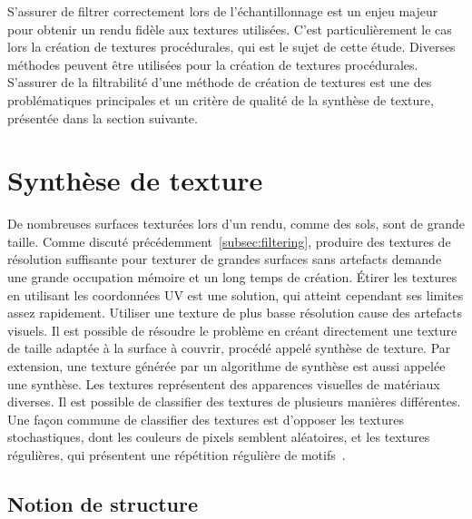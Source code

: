 S'assurer de filtrer correctement lors de l'échantillonnage est un enjeu majeur pour obtenir un rendu fidèle aux textures utilisées. C'est particulièrement le cas lors la création de textures procédurales, qui est le sujet de cette étude. Diverses méthodes peuvent être utilisées pour la création de textures procédurales. S'assurer de la filtrabilité d'une méthode de création de textures est une des problématiques principales et un critère de qualité de la synthèse de texture, présentée dans la section suivante.


\section{Synthèse de texture}

De nombreuses surfaces texturées lors d'un rendu, comme des sols, sont de grande taille. Comme discuté précédemment~\ref{subsec:filtering}, produire des textures de résolution suffisante pour texturer de grandes surfaces sans artefacts demande une grande occupation mémoire et un long temps de création. Étirer les textures en utilisant les coordonnées UV est une solution, qui atteint cependant ses limites assez rapidement. Utiliser une texture de plus basse résolution cause des artefacts visuels. Il est possible de résoudre le problème en créant directement une texture de taille adaptée à la surface à couvrir, procédé appelé synthèse de texture. Par extension, une texture générée par un algorithme de synthèse est aussi appelée une synthèse. Les textures représentent des apparences visuelles de matériaux diverses. Il est possible de classifier des textures de plusieurs manières différentes. Une façon commune de classifier des textures est d'opposer les textures stochastiques, dont les couleurs de pixels semblent aléatoires, et les textures régulières, qui présentent une répétition régulière de motifs~\cite{liu_near-regular_2004}.

\subsection{Notion de structure}
\label{subsec:structure}

